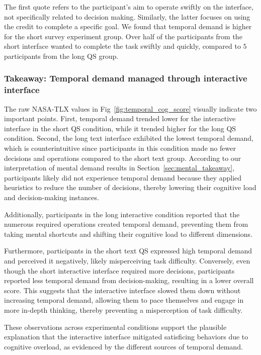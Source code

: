 The first quote refers to the participant's aim to operate swiftly on the interface, not specifically related to decision making. Similarly, the latter focuses on using the credit to complete a specific goal. We found that temporal demand is higher for the short survey experiment group. Over half of the participants from the short interface wanted to complete the task swiftly and quickly, compared to $5$ participants from the long QS group.

\subsubsection{Takeaway: Temporal demand managed through interactive interface}
The raw NASA-TLX values in Fig~\ref{fig:temporal_cog_score} visually indicate two important points. First, temporal demand trended lower for the interactive interface in the short QS condition, while it trended higher for the long QS condition. Second, the long text interface exhibited the lowest temporal demand, which is counterintuitive since participants in this condition made no fewer decisions and operations compared to the short text group. According to our interpretation of mental demand results in Section~\ref{sec:mental_takeaway}, participants likely did not experience temporal demand because they applied heuristics to reduce the number of decisions, thereby lowering their cognitive load and decision-making instances.

Additionally, participants in the long interactive condition reported that the numerous required operations created temporal demand, preventing them from taking mental shortcuts and shifting their cognitive load to different dimensions.

Furthermore, participants in the short text QS expressed high temporal demand and perceived it negatively, likely misperceiving task difficulty. Conversely, even though the short interactive interface required more decisions, participants reported less temporal demand from decision-making, resulting in a lower overall score. This suggests that the interactive interface slowed them down without increasing temporal demand, allowing them to pace themselves and engage in more in-depth thinking, thereby preventing a misperception of task difficulty.

These observations across experimental conditions support the plausible explanation that the interactive interface mitigated satisficing behaviors due to cognitive overload, as evidenced by the different sources of temporal demand.

